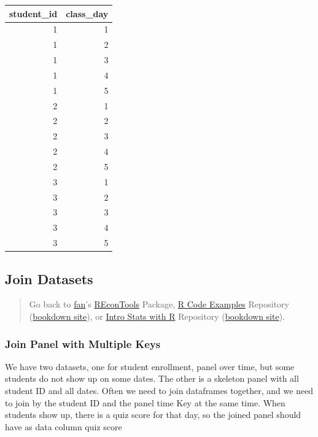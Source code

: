 \documentclass[
]{book}
\begin{document}
\begin{table}[!h]
\centering
\begin{tabular}{r|r}
\hline
student\_id & class\_day\\
\hline
\rowcolor{gray!6}  1 & 1\\
\hline
1 & 2\\
\hline
\rowcolor{gray!6}  1 & 3\\
\hline
1 & 4\\
\hline
\rowcolor{gray!6}  1 & 5\\
\hline
2 & 1\\
\hline
\rowcolor{gray!6}  2 & 2\\
\hline
2 & 3\\
\hline
\rowcolor{gray!6}  2 & 4\\
\hline
2 & 5\\
\hline
\rowcolor{gray!6}  3 & 1\\
\hline
3 & 2\\
\hline
\rowcolor{gray!6}  3 & 3\\
\hline
3 & 4\\
\hline
\rowcolor{gray!6}  3 & 5\\
\hline
\end{tabular}
\end{table}

\hypertarget{join-datasets}{%
\subsection{Join Datasets}\label{join-datasets}}

\begin{quote}
Go back to \href{http://fanwangecon.github.io/}{fan}'s \href{https://fanwangecon.github.io/REconTools/}{REconTools} Package, \href{https://fanwangecon.github.io/R4Econ/}{R Code Examples} Repository (\href{https://fanwangecon.github.io/R4Econ/bookdown}{bookdown site}), or \href{https://fanwangecon.github.io/Stat4Econ/}{Intro Stats with R} Repository (\href{https://fanwangecon.github.io/Stat4Econ/bookdown}{bookdown site}).
\end{quote}

\hypertarget{join-panel-with-multiple-keys}{%
\subsubsection{Join Panel with Multiple Keys}\label{join-panel-with-multiple-keys}}

We have two datasets, one for student enrollment, panel over time, but some students do not show up on some dates. The other is a skeleton panel with all student ID and all dates. Often we need to join dataframes together, and we need to join by the student ID and the panel time Key at the same time. When students show up, there is a quiz score for that day, so the joined panel should have as data column quiz score
\end{document}
